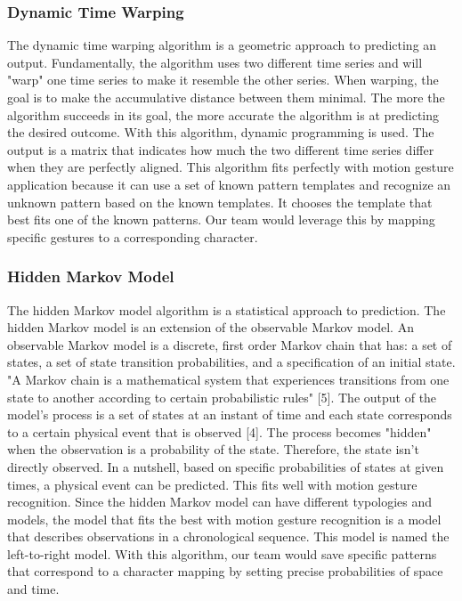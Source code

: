 \documentclass[onecolumn, draftclsnofoot,10pt, journal, letterpaper]{IEEEtran}
\begin{document}
        \subsubsection{Dynamic Time Warping}
            The dynamic time warping algorithm is a geometric approach to predicting an output. Fundamentally, the algorithm uses two different time series and will "warp" one time series to make it resemble the other series. When warping, the goal is to make the accumulative distance between them minimal. The more the algorithm succeeds in its goal, the more accurate the algorithm is at predicting the desired outcome. With this algorithm, dynamic programming is used. The output is a matrix that indicates how much the two different time series differ when they are perfectly aligned. This algorithm fits perfectly with motion gesture application because it can use a set of known pattern templates and recognize an unknown pattern based on the known templates. It chooses the template that best fits one of the known patterns. Our team would leverage this by mapping specific gestures to a corresponding character.
    
        \subsubsection{Hidden Markov Model}
            The hidden Markov model algorithm is a statistical approach to prediction. The hidden Markov model is an extension of the observable Markov model. An observable Markov model is a discrete, first order Markov chain that has: a set of states, a set of state transition probabilities, and a specification of an initial state. "A Markov chain is a mathematical system that experiences transitions from one state to another according to certain probabilistic rules" [5]. The output of the model's process is a set of states at an instant of time and each state corresponds to a certain physical event that is observed [4]. The process becomes "hidden" when the observation is a probability of the state. Therefore, the state isn't directly observed. In a nutshell, based on specific probabilities of states at given times, a physical event can be predicted. This fits well with motion gesture recognition. Since the hidden Markov model can have different typologies and models, the model that fits the best with motion gesture recognition is a model that describes observations in a chronological sequence. This model is named the left-to-right model. With this algorithm, our team would save specific patterns that correspond to a character mapping by setting precise probabilities of space and time. 
    
\end{document}
